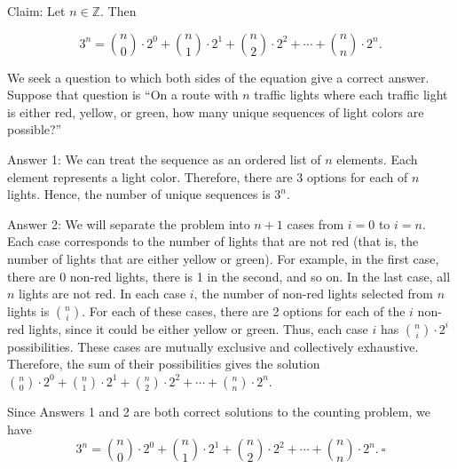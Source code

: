 \documentclass{article}
\newcommand{\Z}{\mathbb{Z}}
\theoremstyle{definition}
\begin{document}
\begin{solution}
Claim: Let $n\in\Z$. Then

\[3^n = \binom{n}{0} \cdot 2^0 + \binom{n}{1}\cdot 2^1+ \binom{n}{2}\cdot 2^2+\cdots +\binom{n}{n}\cdot 2^n.\]

We seek a question to which both sides of the equation give a correct answer. Suppose that question is ``On a route with $n$ traffic lights where each traffic light is either red, yellow, or green, how many unique sequences of light colors are possible?'' 

Answer 1: We can treat the sequence as an ordered list of $n$ elements. Each element represents a light color. Therefore, there are 3 options for each of $n$ lights. Hence, the number of unique sequences is $3^n$. 

Answer 2: We will separate the problem into $n+1$ cases from $i=0$ to $i=n$. Each case corresponds to the number of lights that are not red (that is, the number of lights that are either yellow or green). For example, in the first case, there are 0 non-red lights, there is 1 in the second, and so on. In the last case, all $n$ lights are not red. In each case $i$, the number of non-red lights selected from $n$ lights is $\binom{n}{i}$. For each of these cases, there are 2 options for each of the $i$ non-red lights, since it could be either yellow or green. Thus, each case $i$ has $\binom{n}{i}\cdot 2^i$ possibilities. These cases are mutually exclusive and collectively exhaustive. Therefore, the sum of their possibilities gives the solution $\binom{n}{0} \cdot 2^0 + \binom{n}{1}\cdot 2^1+ \binom{n}{2}\cdot 2^2+\cdots +\binom{n}{n}\cdot 2^n$.

Since Answers 1 and 2 are both correct solutions to the counting problem, we have
\[3^n = \binom{n}{0} \cdot 2^0 + \binom{n}{1}\cdot 2^1+ \binom{n}{2}\cdot 2^2+\cdots +\binom{n}{n}\cdot 2^n.~\square\]
\end{solution}
\end{document}
